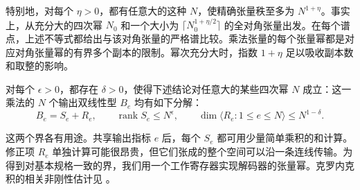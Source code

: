 特别地，对每个 \(\eta>0\)，都有任意大的这种 \(N\)，使精确张量秩至多为 \(N^{1+\eta}\)。事实上，从充分大的四次幂 \(N_0\) 和一个大小为 \(\lceil N_0^{1+\eta/2}\rceil\) 的全对角张量出发。在每个谱点，上述不等式都给出与该对角张量的严格谱比较。乘法张量的每个张量幂都是对应对角张量幂的有界多个副本的限制。幂次充分大时，指数 \(1+\eta\) 足以吸收副本数和取整的影响。

\begin{lemma}[具有短行的解码器]\label{lem:secondary}
对每个 \(\epsilon>0\)，都存在 \(\delta>0\)，使得下述结论对任意大的某些四次幂 \(N\) 成立：这一乘法的 \(N\) 个输出双线性型 \(B_e\) 均有如下分解：
\[
    B_e=S_e+R_e,\qquad
    \operatorname{rank}S_e\le N^\epsilon,\qquad
    \dim\langle R_e:1\le e\le N\rangle\le N^{1-\delta}.
\]
\end{lemma}

这两个界各有用途。共享输出指标 \(e\) 后，每个 \(S_e\) 都可用少量简单乘积的和计算。修正项 \(R_e\) 单独计算可能很昂贵，但它们张成的整个空间可以沿一条连线传输。为得到对基本规格一致的界，我们用一个工作寄存器实现解码器的张量幂。克罗内克积的相关非刚性估计见 \cite{almanrigidity,kivva}。

